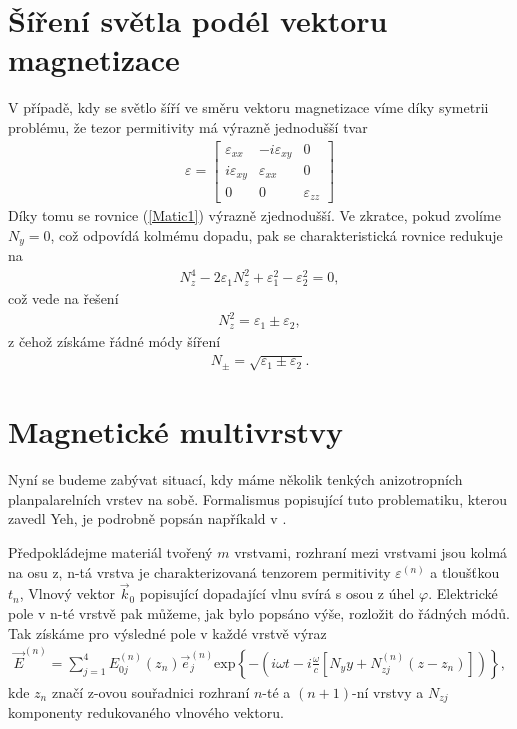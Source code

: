 \section{Šíření světla podél vektoru magnetizace}
V případě, kdy se světlo šíří ve směru vektoru magnetizace víme díky symetrii problému, že tezor permitivity má výrazně jednodušší tvar
\begin{eqnarray}
\varepsilon=\begin{bmatrix}\varepsilon_{xx}&  -i\varepsilon_{xy}& 0 
\\ i\varepsilon_{xy}& \varepsilon_{xx}&  0 \\ 0&0& \varepsilon_{zz}\end{bmatrix}
\label{epsilon polar}
\end{eqnarray}
Díky tomu se rovnice (\ref{Matic1}) výrazně zjednodušší. Ve zkratce, pokud zvolíme $N_y=0$, což odpovídá kolmému dopadu, pak se charakteristická rovnice redukuje na
\begin{eqnarray}
N_z^4-2\varepsilon_1N_z^2+\varepsilon_1^2-\varepsilon_2^2=0,
\end{eqnarray}
což vede na řešení
\begin{eqnarray}
N_z^2=\varepsilon_1 \pm \varepsilon_2,
\end{eqnarray}
z čehož získáme řádné módy šíření
\begin{eqnarray}
N_\pm=\sqrt{\varepsilon_1\pm\varepsilon_2}.
\end{eqnarray}


\section{Magnetické multivrstvy}
Nyní se budeme zabývat situací, kdy máme několik tenkých anizotropních planpalarelních vrstev na sobě. Formalismus popisující tuto problematiku, kterou zavedl Yeh,  je podrobně popsán napříkald v \cite{Nyvlt}.

Předpokládejme materiál tvořený $m$ vrstvami, rozhraní mezi vrstvami jsou kolmá na osu z, n-tá vrstva je charakterizovaná tenzorem permitivity $\varepsilon^{(n)}$ a tloušťkou $t_n$, Vlnový vektor $\vec{k}_0$ popisující dopadající vlnu svírá s osou z úhel $\varphi$. Elektrické pole v n-té vrstvě pak můžeme, jak bylo popsáno výše, rozložit do řádných módů. Tak získáme pro výsledné pole v každé vrstvě výraz
\begin{eqnarray}
\vec{E}^{(n)}=\sum^4_{j=1}E_{0j}^{(n)}(z_n)\vec{e}_j^{(n)}\mbox{exp}\left\{-\left(i\omega t-i\frac{\omega}{c}[N_yy+N_{zj}^{(n)}(z-z_n)]\right)\right\},
\end{eqnarray}
kde $z_n$ značí z-ovou souřadnici rozhraní $n$-té a $(n+1)$-ní vrstvy a $N_{zj}$ komponenty redukovaného vlnového vektoru.

